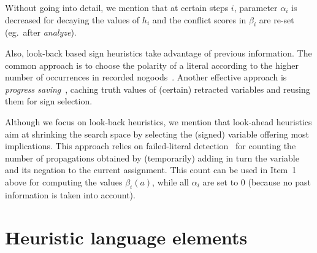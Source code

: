 \documentclass[letterpaper]{article}
\newcommand{\sysfont}{\textit}
\newcommand{\smodels}{\sysfont{smodels}}
\begin{document}
Without going into detail, 
we mention that at certain steps $i$,
parameter $\alpha_i$ is decreased for decaying the values of $h_i$ and
the conflict scores in $\beta_i$ are re-set (eg.~after \textit{analyze}).

Also, look-back based sign heuristics take advantage of previous information.
The common approach is to choose the polarity of a literal according to the higher
number of occurrences in recorded nogoods~\cite{momazhzhma01a}.
Another effective approach is \emph{progress saving}~\cite{pipdar07a},
caching truth values of (certain) retracted variables and reusing them for sign selection.

Although we focus on look-back heuristics,
we mention that look-ahead heuristics 
aim at shrinking the search space by selecting the (signed) variable offering most implications.
This approach relies on failed-literal detection~\cite{freeman95a} for counting the number of
propagations obtained by (temporarily) adding in turn the variable and its negation to the current
assignment.
This count can be used in Item~1 above for computing the values $\beta_i(a)$,
while all $\alpha_i$ are set to 0 (because no past information is taken into account).



\section{Heuristic language elements}\label{sec:approach}
\end{document}
